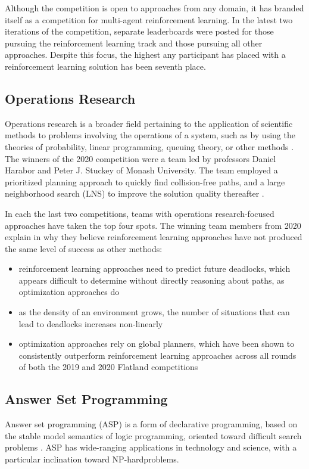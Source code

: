 \documentclass[11pt]{article}
\begin{document}
Although the competition is open to approaches from any domain, it has branded itself as a competition for multi-agent reinforcement learning.  In the latest two iterations of the competition, separate leaderboards were posted for those pursuing the reinforcement learning track and those pursuing all other approaches.  Despite this focus, the highest any participant has placed with a reinforcement learning solution has been seventh place.

\subsection{Operations Research}
Operations research is a broader field pertaining to the application of scientific methods to problems involving the operations of a system, such as by using the theories of probability, linear programming, queuing theory, or other methods \citep{gupta92a}.  The winners of the 2020 competition were a team led by professors Daniel Harabor and Peter J. Stuckey of Monash University.  The team employed a prioritized planning approach to quickly find collision-free paths, and a large neighborhood search (LNS) to improve the solution quality thereafter \citep{lichzhchhastmako21a}.

In each the last two competitions, teams with operations research-focused approaches have taken the top four spots.  The winning team members from 2020 explain in \citep{lichzhchhastmako21a} why they believe reinforcement learning approaches have not produced the same level of success as other methods:
\begin{itemize}
	\item reinforcement learning approaches need to predict future deadlocks, which appears difficult to determine without directly reasoning about paths, as optimization approaches do
	\item as the density of an environment grows, the number of situations that can lead to deadlocks increases non-linearly
	\item optimization approaches rely on global planners, which have been shown to consistently outperform reinforcement learning approaches across all rounds of both the 2019 and 2020 Flatland competitions
\end{itemize}


\subsection{Answer Set Programming}
Answer set programming (ASP) is a form of declarative programming, based on the stable model semantics of logic programming, oriented toward difficult search problems \citep{lifschitz19a}.  ASP has wide-ranging applications in technology and science, with a particular inclination toward NP-hard\footnotemark problems.
\end{document}
